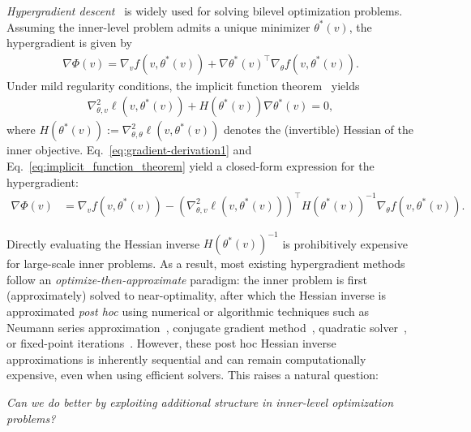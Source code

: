 \documentclass[11 pt]{article}
\begin{document}
\textit{Hypergradient descent}~\cite{ghadimi2018approximation} is widely used for solving bilevel optimization problems. 
Assuming the inner-level problem admits a unique minimizer $\theta^*(v)$, the hypergradient is given by
\begin{align}\label{eq:gradient-derivation1}
    \nabla \Phi(v) = \nabla_v f(v, \theta^*(v)) + \nabla \theta^*(v)^\top \nabla_\theta f(v, \theta^*(v)).
\end{align}
Under mild regularity conditions, the implicit function theorem~\cite{krantz2002implicit} yields
\begin{align}\label{eq:implicit_function_theorem}
    \nabla_{\theta,v}^2 \ell(v, \theta^*(v)) + H(\theta^*(v)) \nabla \theta^*(v) = 0,
\end{align}
where $H(\theta^*(v)) := \nabla^2_{\theta,\theta} \ell(v,\theta^*(v))$ denotes the (invertible) Hessian of the inner objective. 
Eq.~\eqref{eq:gradient-derivation1} and Eq.~\eqref{eq:implicit_function_theorem} yield a closed-form expression for the hypergradient:
\begin{align*}
    \nabla \Phi(v) &= \nabla_v f(v,\theta^*(v)) - \left(\nabla_{\theta,v}^2 \ell (v,\theta^*(v))\right)^\top 
    H(\theta^*(v))^{-1} \nabla_\theta f(v,\theta^*(v)).
 \end{align*}

Directly evaluating the Hessian inverse $H(\theta^*(v))^{-1}$ is prohibitively expensive for large-scale inner problems. 
As a result, most existing hypergradient methods follow an \emph{optimize-then-approximate} paradigm: 
the inner problem is first (approximately) solved to near-optimality, after which the Hessian inverse is approximated \emph{post hoc} using numerical or algorithmic techniques such as 
Neumann series approximation~\cite{ghadimi2018approximation,lorraine2020optimizing,ji2021bilevel}, 
conjugate gradient method~\cite{pedregosa2016hyperparameter,rajeswaran2019meta,yang2023accelerating}, 
quadratic solver~\cite{arbel2021amortized}, or fixed-point iterations~\cite{grazzi2020iteration}. 
However, these post hoc Hessian inverse approximations is inherently sequential and can remain computationally expensive, even when using efficient solvers. This raises a natural question:
\begin{center}
\emph{Can we do better by exploiting additional structure in inner-level optimization problems?}
\end{center}
\end{document}
